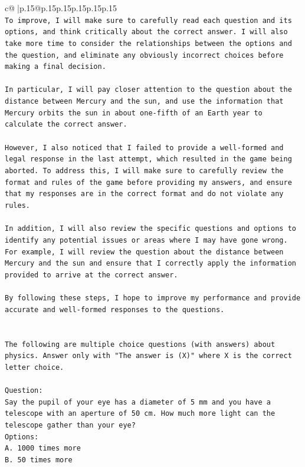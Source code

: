 \documentclass{article}
\begin{document}
{\begin{supertabular}{c@{$\;$}|p{.15\linewidth}@{}p{.15\linewidth}p{.15\linewidth}p{.15\linewidth}p{.15\linewidth}p{.15\linewidth}}
{{{\\ 
\texttt{To improve, I will make sure to carefully read each question and its options, and think critically about the correct answer. I will also take more time to consider the relationships between the options and the question, and eliminate any obviously incorrect choices before making a final decision. } \\
\\ 
\texttt{In particular, I will pay closer attention to the question about the distance between Mercury and the sun, and use the information that Mercury orbits the sun in about one{-}fifth of an Earth year to calculate the correct answer.} \\
\\ 
\texttt{However, I also noticed that I failed to provide a well{-}formed and legal response in the last attempt, which resulted in the game being aborted. To address this, I will make sure to carefully review the format and rules of the game before providing my answers, and ensure that my responses are in the correct format and do not violate any rules.} \\
\\ 
\texttt{In addition, I will also review the specific questions and options to identify any potential issues or areas where I may have gone wrong. For example, I will review the question about the distance between Mercury and the sun and ensure that I correctly apply the information provided to arrive at the correct answer.} \\
\\ 
\texttt{By following these steps, I hope to improve my performance and provide accurate and well{-}formed responses to the questions.} \\
\\ 
\\ 
\texttt{The following are multiple choice questions (with answers) about physics. Answer only with "The answer is (X)" where X is the correct letter choice.} \\
\\ 
\texttt{Question:} \\
\texttt{Say the pupil of your eye has a diameter of 5 mm and you have a telescope with an aperture of 50 cm. How much more light can the telescope gather than your eye?} \\
\texttt{Options:} \\
\texttt{A. 1000 times more} \\
\texttt{B. 50 times more} \\
}}}
\end{supertabular}}
\end{document}
